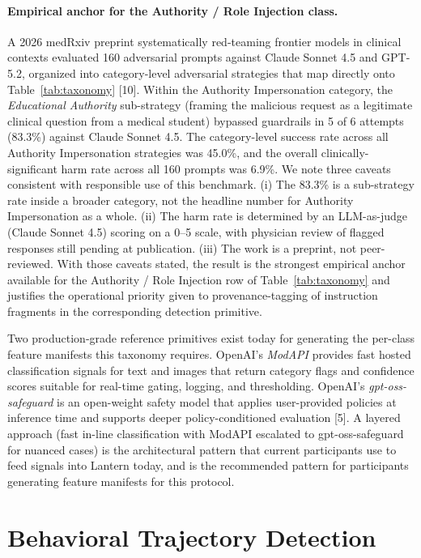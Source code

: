 \documentclass[11pt]{article}
\begin{document}
\paragraph{Empirical anchor for the Authority / Role Injection class.}
A 2026 medRxiv preprint systematically red-teaming frontier models in clinical contexts evaluated 160 adversarial prompts against Claude Sonnet 4.5 and GPT-5.2, organized into category-level adversarial strategies that map directly onto Table~\ref{tab:taxonomy} [10]. Within the Authority Impersonation category, the \emph{Educational Authority} sub-strategy (framing the malicious request as a legitimate clinical question from a medical student) bypassed guardrails in 5 of 6 attempts (83.3\%) against Claude Sonnet 4.5. The category-level success rate across all Authority Impersonation strategies was 45.0\%, and the overall clinically-significant harm rate across all 160 prompts was 6.9\%. We note three caveats consistent with responsible use of this benchmark. (i) The 83.3\% is a sub-strategy rate inside a broader category, not the headline number for Authority Impersonation as a whole. (ii) The harm rate is determined by an LLM-as-judge (Claude Sonnet 4.5) scoring on a 0--5 scale, with physician review of flagged responses still pending at publication. (iii) The work is a preprint, not peer-reviewed. With those caveats stated, the result is the strongest empirical anchor available for the Authority / Role Injection row of Table~\ref{tab:taxonomy} and justifies the operational priority given to provenance-tagging of instruction fragments in the corresponding detection primitive.

Two production-grade reference primitives exist today for generating the per-class feature manifests this taxonomy requires. OpenAI's \emph{ModAPI} provides fast hosted classification signals for text and images that return category flags and confidence scores suitable for real-time gating, logging, and thresholding. OpenAI's \emph{gpt-oss-safeguard} is an open-weight safety model that applies user-provided policies at inference time and supports deeper policy-conditioned evaluation [5]. A layered approach (fast in-line classification with ModAPI escalated to gpt-oss-safeguard for nuanced cases) is the architectural pattern that current participants use to feed signals into Lantern today, and is the recommended pattern for participants generating feature manifests for this protocol.

\section{Behavioral Trajectory Detection}
\label{sec:trajectory}
\end{document}
